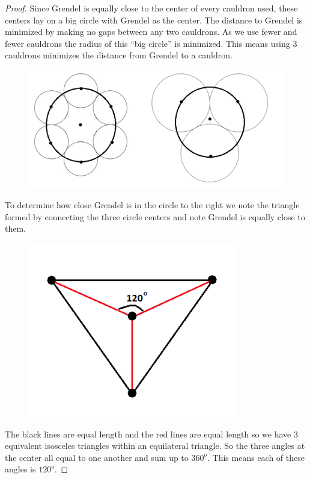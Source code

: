 \documentclass{article}
\begin{document}
\begin{proof}
Since Grendel is equally close to the center of every cauldron used, these centers lay on a big circle with Grendel as the center. The distance to Grendel is minimized by making no gaps between any two cauldrons. As we use fewer and fewer cauldrons the radius of this “big circle” is minimized. This means using 3 cauldrons minimizes the distance from Grendel to a cauldron.


\begin{figure}[h!]
\centering
\includegraphics[scale=.5]{circles}
\end{figure}

To determine how close Grendel is in the circle to the right we note the triangle formed by connecting the three circle centers and note Grendel is equally close to them.

\begin{figure}[h!]
\centering
\includegraphics[scale=.5]{bigtri}
\end{figure}

The black lines are equal length and the red lines are equal length so we have 3 equivalent isosceles triangles within an equilateral triangle. So the three angles at the center all equal to one another and sum up to $360^o$. This means each of these angles is $120^o$.


\end{proof}
\end{document}
